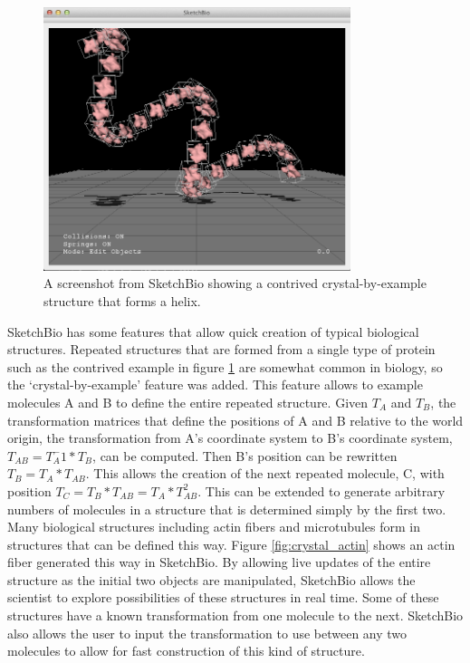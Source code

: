 \documentclass{article} %
\begin{document}
\begin{figure}[h]
\centering
\includegraphics[width=0.8\textwidth]{crystalByExample.png}
\caption{A screenshot from SketchBio showing a contrived crystal-by-example structure that forms a helix.}
\label{fig:crystal_by_example}
\end{figure}
SketchBio has some features that allow quick creation of typical biological structures.  Repeated structures that are formed from a single type of protein such as the contrived example in figure \ref{fig:crystal_by_example} are somewhat common in biology, so the ‘crystal-by-example’ feature was added.  This feature allows to example molecules A and B to define the entire repeated structure.  Given $T_A$ and $T_B$, the transformation matrices that define the positions of A and B relative to the world origin, the transformation from A’s coordinate system to B’s coordinate system, $T_{AB} = T_A^-1*T_B$, can be computed.  Then B’s position can be rewritten $T_B = T_A*T_{AB}$.  This allows the creation of the next repeated molecule, C, with position $T_C = T_B*T_{AB} = T_A*T_{AB}^2$.  This can be extended to generate arbitrary numbers of molecules in a structure that is determined simply by the first two.  Many biological structures including actin fibers and microtubules form in structures that can be defined this way.  Figure \ref{fig:crystal_actin} shows an actin fiber generated this way in SketchBio.  By allowing live updates of the entire structure as the initial two objects are manipulated, SketchBio allows the scientist to explore possibilities of these structures in real time.  Some of these structures have a known transformation from one molecule to the next.  SketchBio also allows the user to input the transformation to use between any two molecules to allow for fast construction of this kind of structure.
\end{document}
